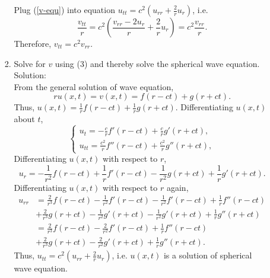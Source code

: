 \documentclass[12pt]{article}%
\begin{document}
\begin{enumerate}
\begin{enumerate}
\begin{enumerate}
\begin{equation}
            \end{equation}
            Plug (\ref{v-equ}) into equation $u_{tt} = c^2\left(u_{rr} + \frac{2}{r}u_r\right)$, i.e.
            \[ \frac{v_{tt}}{r}=c^2\left(\frac{v_{rr}-2u_r}{r}+\frac{2}{r}u_r\right)=c^2\frac{v_{rr}}{r}.\]
            Therefore, $v_{tt}=c^2v_{rr}$.
            \item Solve for $v$ using (3) and thereby solve the spherical wave equation. \smallskip \\
            Solution:\\
            From the general solution of wave equation, 
            \[ru(x,t)=v(x,t)=f(r-ct)+g(r+ct). \]
            Thus, $u(x,t)= \frac{1}{r}f(r-ct)+\frac{1}{r}g(r+ct). $
            Differentiating $u(x,t)$ about $t$,
            \begin{equation*}
                \begin{cases}
                    u_{t}=-\frac{c}{r}f'(r-ct)+\frac{c}{r}g'(r+ct),
                    \\
                    u_{tt}=\frac{c^2}{r}f''(r-ct)+\frac{c^2}{r}g''(r+ct),  
                \end{cases}
            \end{equation*}
            Differentiating $u(x,t)$ with respect to $r$,
            \[ u_{r}=-\frac{1}{r^2}f(r-ct)+\frac{1}{r}f'(r-ct)-\frac{1}{r^2}g(r+ct)+\frac{1}{r}g'(r+ct).\]
        Differentiating $u(x,t)$ with respect to $r$ again,
        \begin{align*}
            u_{rr}&=\frac{2}{r^3}f(r-ct)-\frac{1}{r^2}f'(r-ct)-\frac{1}{r^2}f'(r-ct) +\frac{1}{r}f''(r-ct) \\
               &+\frac{2}{r^3}g(r+ct)-\frac{1}{r^2}g'(r+ct)-\frac{1}{r^2}g'(r+ct) +\frac{1}{r}g''(r+ct)\\
               &=\frac{2}{r^3}f(r-ct)-\frac{2}{r^2}f'(r-ct)+\frac{1}{r}f''(r-ct) \\
               &+\frac{2}{r^3}g(r+ct)-\frac{2}{r^2}g'(r+ct)+\frac{1}{r}g''(r+ct).
        \end{align*}
         Thus, $u_{tt} = c^2\left(u_{rr} + \frac{2}{r}u_r\right)$, i.e. $u(x,t)$ is a solution of spherical wave equation.
           

\end{enumerate}
\end{enumerate}
\end{enumerate}
\end{document}

